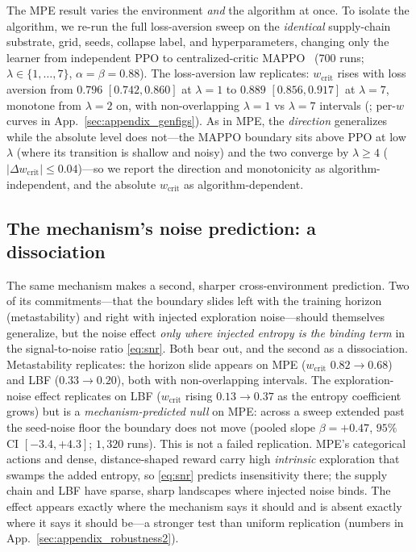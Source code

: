 \documentclass[letterpaper]{article}
\theoremstyle{plain}
\newcommand{\wcrit}{w_{\mathrm{crit}}}
\begin{document}
The MPE result varies the environment \emph{and} the algorithm at once. To
isolate the algorithm, we re-run the full loss-aversion sweep on the
\emph{identical} supply-chain substrate, grid, seeds, collapse label, and
hyperparameters, changing only the learner from independent PPO to
centralized-critic MAPPO~\citep{yu2022surprising} (700 runs;
$\lambda\in\{1,\ldots,7\}$, $\alpha{=}\beta{=}0.88$). The loss-aversion law
replicates: $\wcrit$ rises with loss aversion from $0.796$ $[0.742, 0.860]$ at
$\lambda{=}1$ to $0.889$ $[0.856, 0.917]$ at $\lambda{=}7$, monotone from
$\lambda{=}2$ on, with non-overlapping $\lambda{=}1$ vs $\lambda{=}7$ intervals
(; per-$w$ curves in
App.~\ref{sec:appendix_genfigs}). As in MPE, the \emph{direction} generalizes
while the absolute level does not---the MAPPO boundary sits above PPO at low
$\lambda$ (where its transition is shallow and noisy) and the two converge by
$\lambda{\geq}4$ ($|\Delta\wcrit|\leq 0.04$)---so we report the direction and
monotonicity as algorithm-independent, and the absolute $\wcrit$ as
algorithm-dependent.


\subsection{The mechanism's noise prediction: a dissociation}
\label{sec:dissociation}
The same mechanism makes a second, sharper cross-environment prediction. Two of
its commitments---that the boundary slides left with the training horizon
(metastability) and right with injected exploration noise---should themselves
generalize, but the noise effect \emph{only where injected entropy is the binding
term} in the signal-to-noise ratio \eqref{eq:snr}. Both bear out, and the second
as a dissociation. Metastability replicates: the horizon slide appears on MPE
($\wcrit$ $0.82\!\to\!0.68$) and LBF ($0.33\!\to\!0.20$), both with
non-overlapping intervals. The exploration-noise effect replicates on LBF
($\wcrit$ rising $0.13\!\to\!0.37$ as the entropy coefficient grows) but is a
\emph{mechanism-predicted null} on MPE: across a sweep extended past the
seed-noise floor the boundary does not move (pooled slope $\beta{=}{+}0.47$,
$95\%$ CI $[-3.4,+4.3]$; $1{,}320$ runs). This is not a failed replication.
MPE's categorical actions and dense, distance-shaped reward carry high
\emph{intrinsic} exploration that swamps the added entropy, so \eqref{eq:snr}
predicts insensitivity there; the supply chain and LBF have sparse, sharp
landscapes where injected noise binds. The effect appears exactly where the
mechanism says it should and is absent exactly where it says it should
be---a stronger test than uniform replication (numbers in
App.~\ref{sec:appendix_robustness2}).
\end{document}
